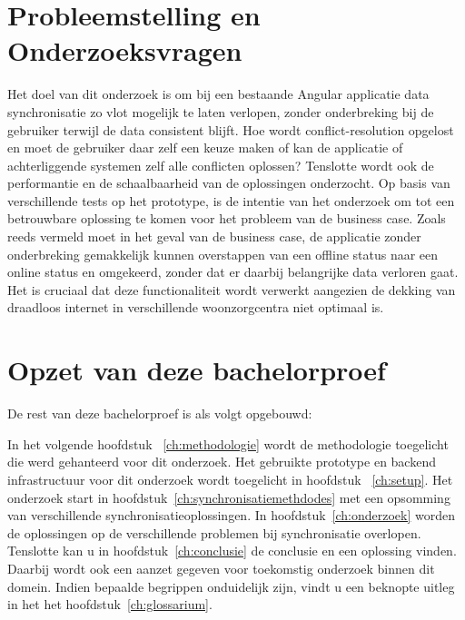 \section{Probleemstelling en Onderzoeksvragen}
\label{sec:onderzoeksvragen}
Het doel van dit onderzoek is om bij een bestaande Angular applicatie data synchronisatie zo vlot mogelijk te laten verlopen, zonder onderbreking bij de gebruiker terwijl de data consistent blijft. Hoe wordt conflict-resolution opgelost en moet de gebruiker daar zelf een keuze maken of kan de applicatie of achterliggende systemen zelf alle conflicten oplossen? Tenslotte wordt ook de performantie en de schaalbaarheid van de oplossingen onderzocht. Op basis van verschillende tests op het prototype, is de intentie van het onderzoek om tot een betrouwbare oplossing te komen voor het probleem van de business case. Zoals reeds vermeld moet in het geval van de business case, de applicatie zonder onderbreking gemakkelijk kunnen overstappen van een offline status naar een online status en omgekeerd, zonder dat er daarbij belangrijke data verloren gaat. Het is cruciaal dat deze functionaliteit wordt verwerkt aangezien de dekking van draadloos internet in verschillende woonzorgcentra niet optimaal is.

\section{Opzet van deze bachelorproef}
\label{sec:opzet-bachelorproef}


De rest van deze bachelorproef is als volgt opgebouwd:

In het volgende hoofdstuk ~\ref{ch:methodologie} wordt de methodologie toegelicht die werd gehanteerd voor dit onderzoek. Het gebruikte prototype en backend infrastructuur voor dit onderzoek wordt toegelicht in hoofdstuk ~\ref{ch:setup}. Het onderzoek start in hoofdstuk~\ref{ch:synchronisatiemethdodes} met een opsomming van verschillende synchronisatieoplossingen. In hoofdstuk~\ref{ch:onderzoek} worden de oplossingen op de verschillende problemen bij synchronisatie overlopen. Tenslotte kan u in hoofdstuk~\ref{ch:conclusie} de conclusie en een oplossing vinden. Daarbij wordt ook een aanzet gegeven voor toekomstig onderzoek binnen dit domein.
Indien bepaalde begrippen onduidelijk zijn, vindt u een beknopte uitleg in het het hoofdstuk~\ref{ch:glossarium}.


